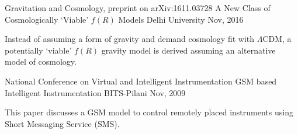 

\begin{cventries}
  \cventry
    {Gravitation and Cosmology, preprint on arXiv:1611.03728} %
    {A New Class of Cosmologically `Viable' $f(R)$ Models} %
    {Delhi University} %
    {Nov, 2016} %
    {
      \begin{cvitems} %
        \item {Instead of assuming a form of gravity and demand cosmology fit with $\Lambda$CDM, a potentially `viable' $f(R)$ gravity model is derived assuming an alternative model of cosmology.}
      \end{cvitems}		
    }

    
  \cventry
    {National Conference on Virtual and Intelligent Instrumentation} %
    {GSM based Intelligent Instrumentation} %
    {BITS-Pilani} %
    {Nov, 2009} %
    {
      \begin{cvitems} %
        \item {This paper discusses a GSM model to control remotely placed instruments using Short
    Messaging Service (SMS).}
      \end{cvitems}		
    }
    
    
    

   
\end{cventries}
